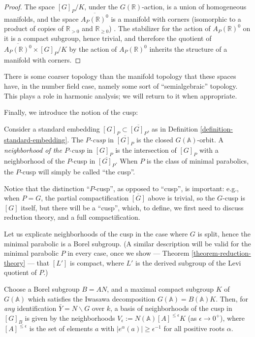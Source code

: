 \begin{proof}
 The space $[G]_P/K$, under the $G(\mathbb R)$-action, is a union of homogeneous manifolds, and the space $\overline{A_P(\mathbb R)^0}$ is a manifold with corners (isomorphic to a product of copies of $\mathbb R_{>0}$ and $\mathbb R_{\ge 0}$) . The stabilizer for the action of $A_P(\mathbb R)^0$ on it is a compact subgroup, hence trivial, and therefore the quotient of $\overline{A_P(\mathbb R)^0} \times [G]_P/K$ by the action of $A_P(\mathbb R)^0$ inherits the structure of a manifold with corners.
\end{proof}

There is some coarser topology than the manifold topology that these spaces have, in the number field case, namely some sort of ``semialgebraic'' topology. This plays a role in harmonic analysis; we will return to it when appropriate.

Finally, we introduce the notion of the cusp:
\begin{definition}
 \label{definition-P-cusp}
 Consider a standard embedding $[G]_P \subset \overline{[G]_P}$, as in Definition \ref{definition-standard-embedding}. The {\it $P$-cusp} in $\overline{[G]_P}$ is the closed $G(\mathbb A)$-orbit. A {\it neighborhood of the $P$-cusp} in $[G]_P$ is the intersection of $[G]_P$ with a neighborhood of the $P$-cusp in $\overline{[G]_P}$. When $P$ is the class of minimal parabolics, the $P$-cusp will simply be called ``the cusp''.
\end{definition}

Notice that the distinction ``$P$-cusp'', as opposed to ``cusp'', is important: e.g., when $P=G$, the partial compactification $\overline{[G]}$ above is trivial, so the $G$-cusp is $[G]$ itself, but there will be a ``cusp'', which, to define, we first need to discuss reduction theory, and a full compactification. 

\begin{remark}
 \label{remark-cusp-Iwasawa}
Let us explicate neighborhoods of the cusp in the case where $G$ is split, hence the minimal parabolic is a Borel subgroup. (A similar description will be valid for the minimal parabolic $P$ in every case, once we show --- Theorem \ref{theorem-reduction-theory} --- that $[L']$ is compact, where $L'$ is the derived subgroup of the Levi quotient of $P$.) 

Choose a Borel subgroup $B=AN$, and a maximal compact subgroup $K$ of $G(\mathbb A)$ which satisfies the Iwasawa decomposition $G(\mathbb A) = B(\mathbb A)K$. 
 Then, for \emph{any} identification $\bar Y = N\backslash G$ over $k$, a basis of neighborhoods of the cusp in $[G]_B$ is given by the neighborhoods $V_\epsilon := N(\mathbb A)[A]^{\le \epsilon}  K$ (as $\epsilon\to 0^+$), where $[A]^{\le \epsilon}$ is the set of elements $a$ with $|e^\alpha(a)|\ge \epsilon^{-1}$ for all positive roots $\alpha$. 
\end{remark} 



